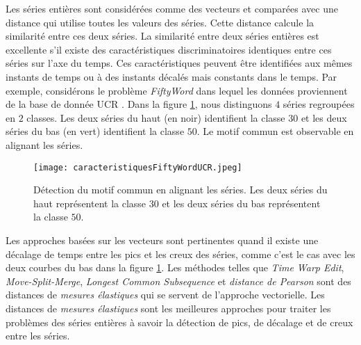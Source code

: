 Les s\'eries enti\`eres sont consid\'er\'ees comme des vecteurs et compar\'ees avec une distance qui utilise toutes les valeurs des s\'eries. 
Cette distance calcule la similarit\'e entre ces deux s\'eries.
La similarit\'e entre deux s\'eries enti\`eres est excellente  s'il existe des caract\'eristiques discriminatoires identiques entre ces s\'eries sur l'axe du temps. Ces caract\'eristiques peuvent \^etre identifi\'ees aux m\^emes instants de temps ou \`a des instants d\'ecal\'es mais constants dans le temps.
Par exemple, consid\'erons le probl\`eme {\em FiftyWord} \cite{rath2003word} dans lequel les donn\'ees proviennent de la base de donn\'ee {UCR} \cite{chen2015ucr}. Dans la figure \ref{caracteristiquesFiftyWordUCR}, nous distinguons $4$ s\'eries regroup\'ees en $2$ classes. Les deux s\'eries du haut (en noir) identifient la classe $30$ et les deux s\'eries du bas (en vert) identifient la classe $50$. Le motif commun est observable en alignant les s\'eries.
\begin{figure}[htb!] 
\centering
\texttt{[image: caracteristiquesFiftyWordUCR.jpeg]}
\caption{D\'etection du motif commun en alignant les s\'eries. Les deux s\'eries du haut repr\'esentent la classe $30$ et les deux s\'eries du bas repr\'esentent la classe $50$.}
\label{caracteristiquesFiftyWordUCR}
\end{figure}

Les approches bas\'ees sur les vecteurs sont pertinentes quand il existe une d\'ecalage de temps entre les pics et les creux des s\'eries, comme c'est le cas avec les deux courbes du bas dans la figure \ref{caracteristiquesFiftyWordUCR}. 
\newline
Les m\'ethodes telles que 
{\em Time Warp Edit}, {\em Move-Split-Merge}, 
{\em Longest Common Subsequence } et 
{\em distance de Pearson} sont des distances de {\em mesures \'elastiques} qui se servent de l'approche vectorielle. 
Les  distances de {\em mesures \'elastiques} sont les meilleures approches pour traiter les probl\`emes des s\'eries enti\`eres \`a savoir la d\'etection de pics, de d\'ecalage et de creux entre les s\'eries.

